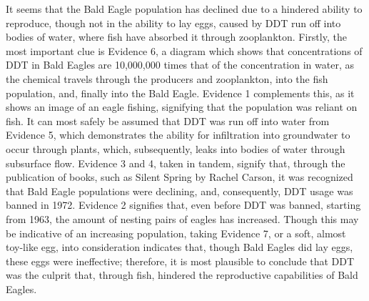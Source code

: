 \documentclass[12pt]{article}
\begin{document}
\begin{justify}
It seems that the Bald Eagle population has declined due to a hindered ability to reproduce, though not in the ability to lay eggs, caused by DDT run off into bodies of water, where fish have absorbed it through zooplankton. Firstly, the most important clue is Evidence 6, a diagram which shows that concentrations of DDT in Bald Eagles are 10,000,000 times that of the concentration in water, as the chemical travels through the producers and zooplankton, into the fish population, and, finally into the Bald Eagle. Evidence 1 complements this, as it shows an image of an eagle fishing, signifying that the population was reliant on fish. It can most safely be assumed that DDT was run off into water from Evidence 5, which demonstrates the ability for infiltration into groundwater to occur through plants, which, subsequently, leaks into bodies of water through subsurface flow. Evidence 3 and 4, taken in tandem, signify that, through the publication of books, such as Silent Spring by Rachel Carson, it was recognized that Bald Eagle populations were declining, and, consequently, DDT usage was banned in 1972. Evidence 2 signifies that, even before DDT was banned, starting from 1963, the amount of nesting pairs of eagles has increased. Though this may be indicative of an increasing population, taking Evidence 7, or a soft, almost toy-like egg, into consideration indicates that, though Bald Eagles did lay eggs, these eggs were ineffective; therefore, it is most plausible to conclude that DDT was the culprit that, through fish, hindered the reproductive capabilities of Bald Eagles.
\end{justify}
\end{document}
